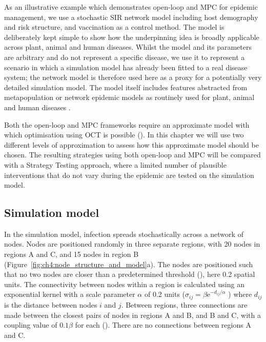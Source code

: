 As an illustrative example which demonstrates open-loop and MPC for epidemic management, we use a stochastic SIR network model including host demography and risk structure, and vaccination as a control method. The model is deliberately kept simple to show how the underpinning idea is broadly applicable across plant, animal and human diseases. Whilst the model and its parameters are arbitrary and do not represent a specific disease, we use it to represent a scenario in which a simulation model has already been fitted to a real disease system; the network model is therefore used here as a proxy for a potentially very detailed simulation model. The model itself includes features abstracted from metapopulation or network epidemic models as routinely used for plant, animal and human diseases \citep{rowthorn_optimal_2009, keeling_dynamics_2001, keeling_metapopulation_2000, margosian_connectivity_2009, bansal_individual_2007}.

Both the open-loop and MPC frameworks require an approximate model with which optimisation using OCT is possible (). In this chapter we will use two different levels of approximation to assess how this approximate model should be chosen. The resulting strategies using both open-loop and MPC will be compared with a Strategy Testing approach, where a limited number of plausible interventions that do not vary during the epidemic are tested on the simulation model. 

\subsection{Simulation model}

In the simulation model, infection spreads stochastically across a network of nodes. Nodes are positioned randomly in three separate regions, with 20 nodes in regions A and C, and 15 nodes in region B (Figure~\ref{fig:ch4:node_structure_and_model}a). The nodes are positioned such that no two nodes are closer than a predetermined threshold (), here 0.2 spatial units. The connectivity between nodes within a region is calculated using an exponential kernel with a scale parameter $\alpha$ of 0.2 units ($\sigma_{ij} = \beta\mathrm{e}^{-d_{ij}/\alpha}$ ) where $d_{ij}$ is the distance between nodes $i$ and $j$. Between regions, three connections are made between the closest pairs of nodes in regions A and B, and B and C, with a coupling value of $0.1\beta$ for each (). There are no connections between regions A and C.

